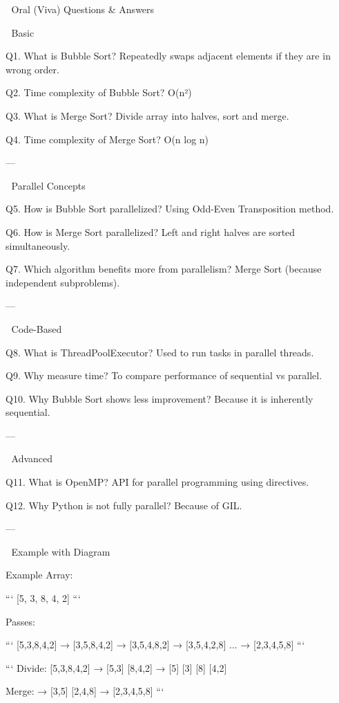  🎯 Oral (Viva) Questions & Answers

 🔹 Basic

Q1. What is Bubble Sort?
Repeatedly swaps adjacent elements if they are in wrong order.

Q2. Time complexity of Bubble Sort?
O(n²)

Q3. What is Merge Sort?
Divide array into halves, sort and merge.

Q4. Time complexity of Merge Sort?
O(n log n)

---

 🔹 Parallel Concepts

Q5. How is Bubble Sort parallelized?
Using Odd-Even Transposition method.

Q6. How is Merge Sort parallelized?
Left and right halves are sorted simultaneously.

Q7. Which algorithm benefits more from parallelism?
Merge Sort (because independent subproblems).

---

 🔹 Code-Based

Q8. What is ThreadPoolExecutor?
Used to run tasks in parallel threads.

Q9. Why measure time?
To compare performance of sequential vs parallel.

Q10. Why Bubble Sort shows less improvement?
Because it is inherently sequential.

---

 🔹 Advanced

Q11. What is OpenMP?
API for parallel programming using directives.

Q12. Why Python is not fully parallel?
Because of GIL.

---

 🔢 Example with Diagram

 Example Array:

```
[5, 3, 8, 4, 2]
```


Passes:

```
[5,3,8,4,2]
→ [3,5,8,4,2]
→ [3,5,4,8,2]
→ [3,5,4,2,8]
...
→ [2,3,4,5,8]
```

```
Divide:
[5,3,8,4,2]
→ [5,3] [8,4,2]
→ [5] [3] [8] [4,2]

Merge:
→ [3,5] [2,4,8]
→ [2,3,4,5,8]
```

